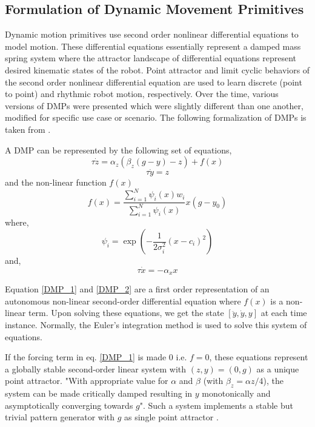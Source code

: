 \subsection{Formulation of Dynamic Movement Primitives}

\par Dynamic motion primitives use second order nonlinear differential equations to model motion. These differential equations essentially represent a damped mass spring system where the attractor landscape of differential equations represent desired kinematic states of the robot. Point attractor and limit cyclic behaviors of the second order nonlinear differential equation are used to learn discrete (point to point) and rhythmic robot motion, respectively. Over the time, various versions of DMPs were presented which were slightly different than one another, modified for specific use case or scenario. The following formalization of DMPs is taken from \cite{ijspeert2013dynamical}.

A DMP can be represented by the following set of equations,  
\begin{equation}\label{DMP_1}
\tau\dot{z} = \alpha_{z}(\beta_{z}(g - y) - z) + f(x)
\end{equation}
\begin{equation}\label{DMP_2}
\tau \dot{y} = z
\end{equation}
and the non-linear function $f(x)$
\begin{equation}\label{forcing_term}
f(x) = \frac{\sum_{i=1}^{N}\psi_{i}(x)w_{i}}{\sum_{i=1}^{N}\psi_{i}(x)}x(g - y_{0})
\end{equation}
where,
\begin{equation}\label{psi}
\psi_{i} = \exp(-{\frac{1}{2\sigma_{i}^{2}}(x - c_{i})^{2}})
\end{equation}
and,
\begin{equation}\label{canonical}
\tau \dot{x} = -\alpha_{x}x
\end{equation}

Equation \ref{DMP_1} and \ref{DMP_2} are a first order representation of an autonomous non-linear second-order differential equation where $f(x)$ is a non-linear term. 
Upon solving these equations, we get the state $[\ddot{y}, \dot{y}, y]$ at each time instance. Normally, the Euler's integration method is used to solve this system of equations.  

If the forcing term in eq. \ref{DMP_1} is made 0 i.e. $f = 0$, these equations represent a globally stable second-order linear system with $(z, y) = (0, g)$ as a unique point attractor. "With appropriate value for $\alpha$ and $\beta$ (with $\beta_{z} = \alpha{z}/4$), the system can be made critically damped resulting in $y$ monotonically and asymptotically converging towards $g$"\cite{ijspeert2013dynamical}. Such a system implements a stable but trivial pattern generator with $g$ as single point attractor \cite{ijspeert2013dynamical}.

